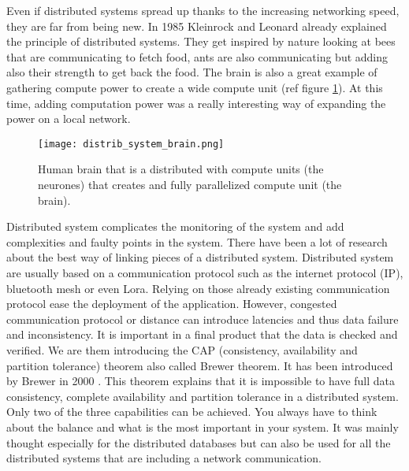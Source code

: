 
Even if distributed systems spread up thanks to the increasing networking speed, they are far from being new. In 1985 Kleinrock and Leonard \cite{kleinrockDistributedSystems} already explained the principle of distributed systems. They get inspired by nature looking at bees that are communicating to fetch food, ants are also communicating but adding also their strength to get back the food. The brain is also a great example of gathering compute power to create a wide compute unit (ref figure \ref{fig:distrib_system_brain}).
At this time, adding computation power was a really interesting way of expanding the power on a local network.

\begin{figure}[h!]
    \centering
    \texttt{[image: distrib\_system\_brain.png]}
    \caption{Human brain that is a distributed with compute units (the neurones) that creates and fully parallelized compute unit (the brain).}
    \vspace{0.1cm}
    \label{fig:distrib_system_brain}
\end{figure}



Distributed system complicates the monitoring of the system and add complexities and faulty points in the system. There have been a lot of
research about the best way of linking pieces of a distributed system. Distributed system are usually based on a communication protocol such as the internet protocol (IP), bluetooth mesh or even Lora.
Relying on those already existing communication protocol ease the deployment of the application.
However, congested communication protocol or distance can introduce latencies and thus data failure and inconsistency.
It is important in a final product that the data is checked and verified.
We are them introducing the CAP (consistency, availability and partition tolerance) theorem also called Brewer theorem.
It has been introduced by Brewer in 2000 \cite{brewerRobustDistributedSystems2000}.
This theorem explains that it is impossible to have full data consistency, complete availability and partition tolerance
in a distributed system. Only two of the three capabilities can be achieved.
You always have to think about the balance and what is the most important in your system.
It was mainly thought especially for the distributed databases but can also be used for all the distributed systems that are
including a network communication.

